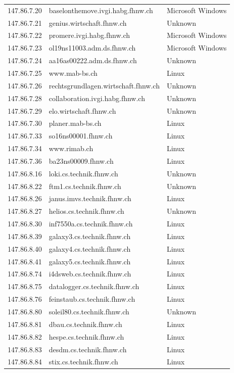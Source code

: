 \documentclass[11pt,a4paper]{scrartcl}
\begin{document}
\begin{longtable}{p{2.5cm}|p{8cm}|l}
	147.86.7.20 & baselonthemove.ivgi.habg.fhnw.ch & Microsoft Windows\\
	147.86.7.21 & genius.wirtschaft.fhnw.ch & Unknown\\
	147.86.7.22 & promere.ivgi.habg.fhnw.ch & Microsoft Windows\\
	147.86.7.23 & ol19ns11003.adm.ds.fhnw.ch & Microsoft Windows\\
	147.86.7.24 & aa16as00222.adm.ds.fhnw.ch & Unknown\\
	147.86.7.25 & www.mab-bs.ch & Linux\\
	147.86.7.26 & rechtsgrundlagen.wirtschaft.fhnw.ch & Unknown\\
	147.86.7.28 & collaboration.ivgi.habg.fhnw.ch & Unknown\\
	147.86.7.29 & elo.wirtschaft.fhnw.ch & Unknown\\
	147.86.7.30 & planer.mab-bs.ch & Linux\\
	147.86.7.33 & so16ns00001.fhnw.ch & Linux\\
	147.86.7.34 & www.rimab.ch & Linux\\
	147.86.7.36 & ba23ns00009.fhnw.ch & Linux\\
	147.86.8.16 & loki.cs.technik.fhnw.ch & Unknown\\
	147.86.8.22 & ftm1.cs.technik.fhnw.ch & Unknown\\
	147.86.8.26 & janus.imvs.technik.fhnw.ch & Linux\\
	147.86.8.27 & helios.cs.technik.fhnw.ch & Unknown\\
	147.86.8.30 & inf7550a.cs.technik.fhnw.ch & Linux\\
	147.86.8.39 & galaxy3.cs.technik.fhnw.ch & Linux\\
	147.86.8.40 & galaxy4.cs.technik.fhnw.ch & Linux\\
	147.86.8.41 & galaxy5.cs.technik.fhnw.ch & Linux\\
	147.86.8.74 & i4dsweb.cs.technik.fhnw.ch & Linux\\
	147.86.8.75 & datalogger.cs.technik.fhnw.ch & Linux\\
	147.86.8.76 & feinstaub.cs.technik.fhnw.ch & Linux\\
	147.86.8.80 & soleil80.cs.technik.fhnw.ch & Unknown\\
	147.86.8.81 & dbau.cs.technik.fhnw.ch & Linux\\
	147.86.8.82 & hespe.cs.technik.fhnw.ch & Linux\\
	147.86.8.83 & desdm.cs.technik.fhnw.ch & Linux\\
	147.86.8.84 & stix.cs.technik.fhnw.ch & Linux\\

\end{longtable}
\end{document}
